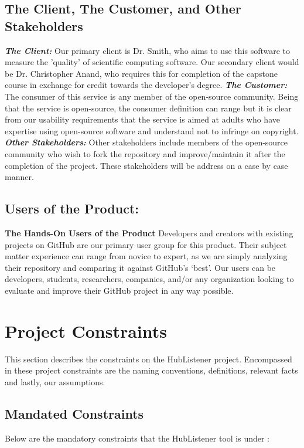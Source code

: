\documentclass{article}
\begin{document}
\subsection{The Client, The Customer, and Other Stakeholders}
\textbf{\textit{The Client:}}
Our primary client is Dr. Smith, who aims to use this software to measure the 'quality' of scientific computing software. Our secondary client would be Dr. Christopher Anand, who requires this for completion of the capstone course in exchange for credit towards the developer’s degree. \newline
\textbf{\textit{The Customer:}}
The consumer of this service is any member of the open-source community. Being that the service is open-source, the consumer definition can range but it is clear from our usability requirements that the service is aimed at adults who have expertise using open-source software and understand not to infringe on copyright. \newline
\textbf{\textit{Other Stakeholders:}}
Other stakeholders include members of the open-source community who wish to fork the repository and improve/maintain it after the completion of the project. These stakeholders will be address on a case by case manner. \newline

\subsection{Users of the Product:}
\textbf{The Hands-On Users of the Product}
\newline
Developers and creators with existing projects on GitHub are our primary user group for this product. Their subject matter experience can range from novice to expert, as we are simply analyzing their repository and comparing it against GitHub’s ‘best’. Our users can be developers, students, researchers, companies, and/or any organization looking to evaluate and improve their GitHub project in any way possible. 
\newpage


\section{Project Constraints}
This section describes the constraints on the  HubListener project. Encompassed in these project constraints are the naming conventions, definitions, relevant facts and lastly, our assumptions.
\subsection{Mandated Constraints}
Below are the mandatory constraints that the HubListener tool is under : \newline
\end{document}
